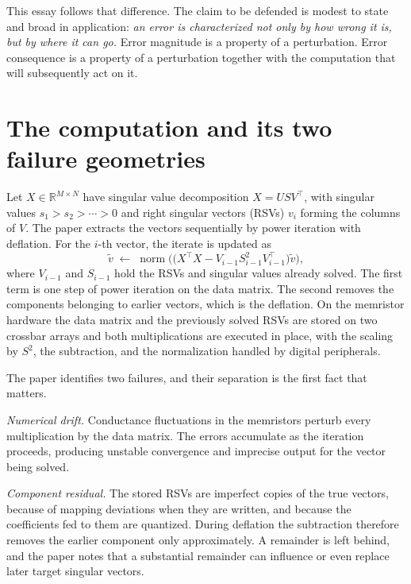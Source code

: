 \documentclass[11pt]{article}
\theoremstyle{definition}
\theoremstyle{remark}
\newcommand{\XtX}{X^{\!\top}\!X}
\begin{document}
This essay follows that difference. The claim to be defended is modest to state and broad in application: \emph{an error is characterized not only by how wrong it is, but by where it can go.} Error magnitude is a property of a perturbation. Error consequence is a property of a perturbation together with the computation that will subsequently act on it.

\section{The computation and its two failure geometries}

Let $X\in\mathbb{R}^{M\times N}$ have singular value decomposition $X=USV^{\top}$, with singular values $s_1>s_2>\cdots>0$ and right singular vectors (RSVs) $v_i$ forming the columns of $V$. The paper extracts the vectors sequentially by power iteration with deflation. For the $i$-th vector, the iterate is updated as
\begin{equation}
  \tilde v \;\leftarrow\; \operatorname{norm}\!\Big(\big(\XtX - V_{i-1}S_{i-1}^{2}V_{i-1}^{\top}\big)\tilde v\Big),
  \label{eq:deflation}
\end{equation}
where $V_{i-1}$ and $S_{i-1}$ hold the RSVs and singular values already solved. The first term is one step of power iteration on the data matrix. The second removes the components belonging to earlier vectors, which is the deflation. On the memristor hardware the data matrix and the previously solved RSVs are stored on two crossbar arrays and both multiplications are executed in place, with the scaling by $S^2$, the subtraction, and the normalization handled by digital peripherals.

The paper identifies two failures, and their separation is the first fact that matters.

\emph{Numerical drift.} Conductance fluctuations in the memristors perturb every multiplication by the data matrix. The errors accumulate as the iteration proceeds, producing unstable convergence and imprecise output for the vector being solved.

\emph{Component residual.} The stored RSVs are imperfect copies of the true vectors, because of mapping deviations when they are written, and because the coefficients fed to them are quantized. During deflation the subtraction therefore removes the earlier component only approximately. A remainder is left behind, and the paper notes that a substantial remainder can influence or even replace later target singular vectors.
\end{document}
